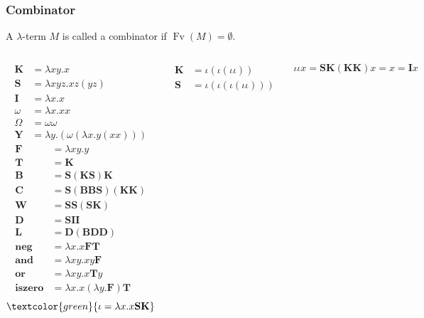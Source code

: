 \documentclass[UTF8,aspectratio=43,11pt,colorlinks,compress,openany]{beamer}%
\begin{document}
\begin{frame}\frametitle{Combinator}
	\setlength\abovedisplayskip{0pt}
	\setlength\belowdisplayskip{0pt}
	\begin{definition}[Combinator]
		A $\lambda$-term $M$ is called a combinator if $\operatorname{Fv}(M)=\emptyset$.
	\end{definition}
	\begin{columns}
			\begin{align*}
			\mathbf{K}&=\lambda xy.x\\
			\mathbf{S}&=\lambda xyz.xz(yz)\\
			\mathbf{I}&=\lambda x.x\\
			\omega&=\lambda x.xx\\
			\Omega&=\omega\omega\\
			\mathbf{Y}&=\lambda y.(\omega(\lambda x.y(xx)))
			\end{align*}
			\begin{align*}
			\mathbf{F}&=\lambda xy.y\\
			\mathbf{T}&=\mathbf{K}\\
			\mathbf{B}&=\mathbf{S}(\mathbf{K}\mathbf{S})\mathbf{K}\\
			\mathbf{C}&=\mathbf{S}(\mathbf{B}\mathbf{B}\mathbf{S})(\mathbf{K}\mathbf{K})\\
			\mathbf{W}&=\mathbf{S}\mathbf{S}(\mathbf{S}\mathbf{K})\\
			\mathbf{D}&=\mathbf{S}\mathbf{I}\mathbf{I}\\
			\mathbf{L}&=\mathbf{D}(\mathbf{B}\mathbf{D}\mathbf{D})\\
			\mathbf{neg}&=\lambda x.x\mathbf{F}\mathbf{T}\\
			\mathbf{and}&=\lambda xy.xy\mathbf{F}\\
			\mathbf{or}&=\lambda xy.x\mathbf{T}y\\
			\mathbf{iszero}&=\lambda x.x(\lambda y.\mathbf{F})\mathbf{T}
			\end{align*}
			\[\textcolor{green}{\iota=\lambda x.x\mathbf{S}\mathbf{K}}\]
			\begin{block}{}
			\setlength\abovedisplayskip{0pt}
			\setlength\belowdisplayskip{0pt}
				\begin{align*}
				\mathbf{K}&=\iota(\iota(\iota\iota))\\
				\mathbf{S}&=\iota(\iota(\iota(\iota\iota)))
				\end{align*}
			\end{block}
			\[\iota\iota x=\mathbf{S}\mathbf{K}(\mathbf{K}\mathbf{K})x=x=\mathbf{I}x\]
	\end{columns}
\end{frame}
\end{document}
